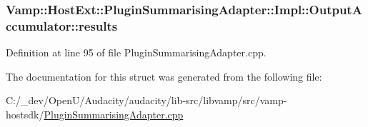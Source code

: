 \subsubsection[{\texorpdfstring{results}{results}}]{ Vamp\+::\+Host\+Ext\+::\+Plugin\+Summarising\+Adapter\+::\+Impl\+::\+Output\+Accumulator\+::results}\hypertarget{struct_vamp_1_1_host_ext_1_1_plugin_summarising_adapter_1_1_impl_1_1_output_accumulator_ad2b9fb1175792aba19748080ff9318af}{}\label{struct_vamp_1_1_host_ext_1_1_plugin_summarising_adapter_1_1_impl_1_1_output_accumulator_ad2b9fb1175792aba19748080ff9318af}


Definition at line 95 of file Plugin\+Summarising\+Adapter.\+cpp.



The documentation for this struct was generated from the following file\+:\begin{DoxyCompactItemize}
\item 
C\+:/\+\_\+dev/\+Open\+U/\+Audacity/audacity/lib-\/src/libvamp/src/vamp-\/hostsdk/\hyperlink{_plugin_summarising_adapter_8cpp}{Plugin\+Summarising\+Adapter.\+cpp}\end{DoxyCompactItemize}
